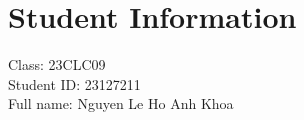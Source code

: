 \section{Student Information}
Class: 23CLC09 \\
Student ID: 23127211 \\
Full name: Nguyen Le Ho Anh Khoa